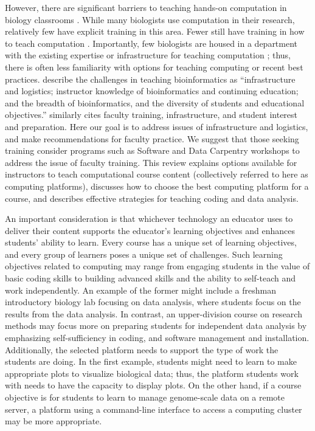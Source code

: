 However, there are significant barriers to teaching hands-on computation in biology classrooms \citep{Williams17}.
While many biologists use computation in their research, relatively few have explicit training in this area. 
Fewer still have training in how to teach computation \citep{Williams17}.
Importantly, few biologists are housed in a department with the existing expertise or infrastructure for teaching computation \citep{Williams17};
thus, there is often less familiarity with options for teaching computing or recent best practices. 
\citet{Cummings10} describe the challenges in teaching bioinformatics as 
``infrastructure and logistics; instructor knowledge of bioinformatics and continuing education; and the breadth of bioinformatics, and the diversity of students and educational objectives.''
\citet{Williams17} similarly cites faculty training, infrastructure, and student interest and preparation.
Here our goal is to address issues of infrastructure and logistics,
and make recommendations for faculty practice.
We suggest that those seeking training consider programs such as Software and Data Carpentry workshops
to address the issue of faculty training.
This review explains options available for instructors to teach computational course content
(collectively referred to here as computing platforms),
discusses how to choose the best computing platform for a course, 
and describes effective strategies for teaching coding and data analysis.


An important consideration is that whichever technology an educator uses to deliver their content supports the educator's learning objectives and enhances students' ability to learn. 
Every course has a unique set of learning objectives, and
every group of learners poses a unique set of challenges. 
Such learning objectives related to computing may range from engaging students in the value of basic coding skills to building advanced skills and the ability to self-teach and work independently.
An example of the former might include a freshman introductory biology lab focusing on data analysis, where students focus on the results from the data analysis. 
In contrast, an upper-division course on research methods may focus more on preparing students for independent data analysis by emphasizing self-sufficiency in coding, and software management and installation.
Additionally, the selected platform needs to support the type of work the students are doing.
In the first example, students might need to learn to make appropriate plots to visualize biological data; thus, the platform students work with needs to have the capacity to display plots.
On the other hand, if a course objective is for students to learn to manage genome-scale data on a remote server, a platform using a command-line interface to access a computing cluster may be more appropriate.

